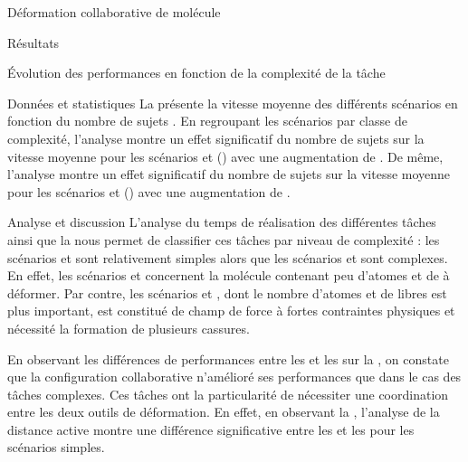\documentclass[myfrancais,ngerman,english,frenchb]{mythesis}
\begin{document}
\begin{mychapter}{Déformation collaborative de molécule}
\begin{mysection}{Résultats}
\begin{mysubsection}{Évolution des performances en fonction de la complexité de la tâche}
\begin{mysubsubsection}{Données et statistiques}
					La  présente la vitesse moyenne  des différents scénarios  en fonction du nombre de sujets .
					En regroupant les scénarios par classe de complexité, l'analyse montre un effet significatif du nombre de sujets  sur la vitesse moyenne  pour les scénarios  et  () avec une augmentation de .
					De même, l'analyse montre un effet significatif du nombre de sujets  sur la vitesse moyenne  pour les scénarios  et  () avec une augmentation de .
				\end{mysubsubsection}
				\begin{mysubsubsection}{Analyse et discussion}
					L'analyse du temps de réalisation des différentes tâches ainsi que la  nous permet de classifier ces tâches par niveau de complexité : les scénarios  et  sont relativement simples alors que les scénarios  et  sont complexes.
					En effet, les scénarios  et  concernent la molécule \myTRPZIPPER contenant peu d'atomes et de  à déformer.
					Par contre, les scénarios  et , dont le nombre d'atomes et de  libres est plus important, est constitué de champ de force à fortes contraintes physiques et nécessité la formation de plusieurs cassures.

					En observant les différences de performances entre les  et les  sur la , on constate que la configuration collaborative n'amélioré ses performances que dans le cas des tâches complexes.
					Ces tâches ont la particularité de nécessiter une coordination entre les deux outils de déformation.
					En effet, en observant la , l'analyse de la distance active montre une différence significative entre les  et les  pour les scénarios simples.


\end{mysubsubsection}
\end{mysubsection}
\end{mysection}
\end{mychapter}
\end{document}
